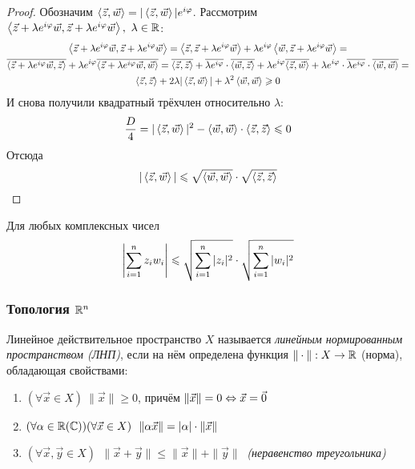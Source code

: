 \begin{proof}
	Обозначим $\left\langle\vec{z}, \vec{w}\right\rangle = |\left\langle\vec{z}, \vec{w}\right\rangle|e^{i\varphi}$. Рассмотрим $\left\langle\vec{z} + \lambda e^{i\varphi} \vec{w}, \vec{z} + \lambda e^{i\varphi} \vec{w}\right\rangle,\ \lambda \in \mathbb{R}$:
	\begin{multline*}
		\left\langle\vec{z} + \lambda e^{i\varphi} \vec{w}, \vec{z} + \lambda e^{i\varphi} \vec{w}\right\rangle = \left\langle\vec{z}, \vec{z} + \lambda e^{i\varphi} \vec{w}\right\rangle + \lambda e^{i\varphi} \left\langle\vec{w}, \vec{z} + \lambda e^{i\varphi} \vec{w}\right\rangle =
		\\
		\overline{\left\langle\vec{z} + \lambda e^{i\varphi} \vec{w}, \vec{z}\right\rangle} + \lambda e^{i\varphi} \overline{\left\langle\vec{z} + \lambda e^{i\varphi} \vec{w}, \vec{w}\right\rangle} = \overline{\left\langle\vec{z}, \vec{z}\right\rangle} + \overline{\lambda e^{i \varphi}} \cdot \overline{\left\langle\vec{w}, \vec{z}\right\rangle} + \lambda e^{i\varphi} \overline{\left\langle\vec{z}, \vec{w}\right\rangle} + \lambda e^{i\varphi} \cdot \overline{\lambda e^{i\varphi}} \cdot \overline{\left\langle\vec{w}, \vec{w}\right\rangle} =
		\\
		\left\langle\vec{z}, \vec{z}\right\rangle + 2\lambda |\left\langle\vec{z}, \vec{w}\right\rangle| + \lambda^2 \left\langle\vec{w}, \vec{w}\right\rangle \geqslant 0
	\end{multline*}
	И снова получили квадратный трёхчлен относительно $\lambda$:
	\[
		\frac{D}{4} = |\left\langle\vec{z}, \vec{w}\right\rangle|^2 - \left\langle\vec{w}, \vec{w}\right\rangle \cdot \left\langle\vec{z}, \vec{z}\right\rangle \leqslant 0
	\]
	Отсюда
	\[
		|\left\langle\vec{z}, \vec{w}\right\rangle| \leqslant \sqrt{\left\langle\vec{w}, \vec{w}\right\rangle} \cdot \sqrt{\left\langle\vec{z}, \vec{z}\right\rangle}
	\]
\end{proof}

\begin{corollary}
	Для любых комплексных чисел
	\[
		\left|\sum\limits_{i = 1}^n z_i w_i\right| \leqslant \sqrt{\sum\limits_{i = 1}^n |z_i|^2} \cdot \sqrt{\sum\limits_{i = 1}^n |w_i|^2}
	\]
\end{corollary}

\subsubsection*{Топология $\mathbb{R}^n$}

\begin{definition}
	Линейное действительное пространство $X$ называется
	\textit{линейным нормированным пространством (ЛНП)},
	если на нём определена функция $\|\cdot\|: X \rightarrow \mathbb{R}$
	(норма), обладающая свойствами:
	\begin{enumerate}
		\item $(\forall \vec{x} \in X)\ \|\vec{x}\| \ge 0$,
			причём $\|\vec{x}\| = 0 \Leftrightarrow \vec{x} = \vec{0}$
		
		\item $(\forall \alpha \in \mathbb{R}(\mathbb{C}))(\forall \vec{x}
			\in X)\ \ \|\alpha \vec{x}\| = |\alpha| \cdot \|\vec{x}\|$
		
		\item $(\forall \vec{x}, \vec{y} \in X)\ \ \|\vec{x}
			+ \vec{y}\| \le \|\vec{x}\| + \|\vec{y}\|\ $
			\textit{(неравенство треугольника)}
	\end{enumerate}
\end{definition}

